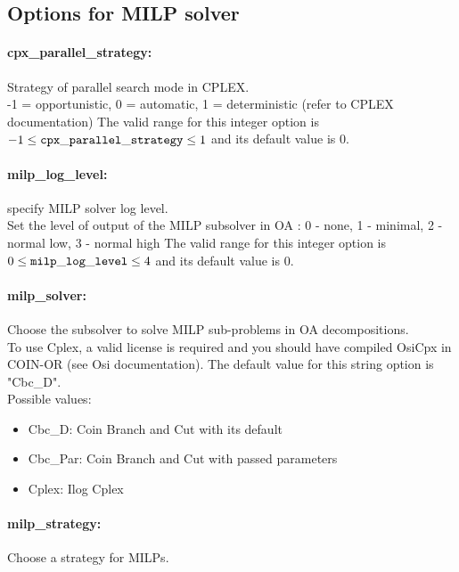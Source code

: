 \subsection{Options for MILP solver}
\label{sec:Options_for_MILP_solver}
\paragraph{\bf cpx\_parallel\_strategy:}\label{sec:cpx_parallel_strategy} Strategy of parallel search mode in CPLEX. $\;$ \\
 -1 = opportunistic, 0 = automatic, 1 =
deterministic (refer to CPLEX documentation) The valid range for this integer option is
$-1 \le {\tt cpx\_parallel\_strategy } \le 1$
and its default value is $0$.


\paragraph{\bf milp\_log\_level:}\label{sec:milp_log_level} specify MILP solver log level. $\;$ \\
 Set the level of output of the MILP subsolver in
OA : 0 - none, 1 - minimal, 2 - normal low, 3 -
normal high The valid range for this integer option is
$0 \le {\tt milp\_log\_level } \le 4$
and its default value is $0$.


\paragraph{\bf milp\_solver:}\label{sec:milp_solver} Choose the subsolver to solve MILP sub-problems in OA decompositions. $\;$ \\
  To use Cplex, a valid license is required and
you should have compiled OsiCpx in COIN-OR  (see
Osi documentation).
The default value for this string option is "Cbc\_D".
\\ 
Possible values:
\begin{itemize}
   \item Cbc\_D: Coin Branch and Cut with its default
   \item Cbc\_Par: Coin Branch and Cut with passed parameters
   \item Cplex: Ilog Cplex
\end{itemize}

\paragraph{\bf milp\_strategy:}\label{sec:milp_strategy} Choose a strategy for MILPs. $\;$ \\

